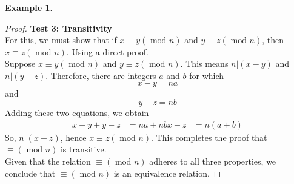 \documentclass{book}
\theoremstyle{definition}
\newtheorem{example}{Example}[definition]
\theoremstyle{remark}
\begin{document}
\begin{example}
\begin{proof}
            \textbf{Test 3: Transitivity } \\    
                For this, we must show that if $x \equiv y (\text{ mod } n)$ and $y \equiv z (\text{ mod } n)$, then $x \equiv z (\text{ mod } n)$. Using a direct proof. \\
                
                Suppose $x \equiv y (\text{ mod } n)$ and $y \equiv z (\text{ mod } n)$. This means $n | (x-y)$ and $n | (y-z)$. Therefore, there are integers $a$ and $b$ for which 
                    \begin{equation*}
                        x-y=na        
                    \end{equation*}
                and 
                    \begin{equation*}
                        y-z=nb
                    \end{equation*}
                Adding these two equations, we obtain 
                    \begin{align*}
                        x-y + y-z   & = na + nb
                        x - z       & = n(a+b) 
                    \end{align*}
                So, $n |(x-z)$, hence $x \equiv z (\text{ mod } n)$. This completes the proof that  $\equiv (\text{ mod } n)$ is transitive. \\
                
        Given that the relation $\equiv (\text{ mod } n)$ adheres to all three properties, we conclude that $\equiv (\text{ mod } n)$ is an equivalence relation.
        \end{proof}
    \end{example}
\end{document}
